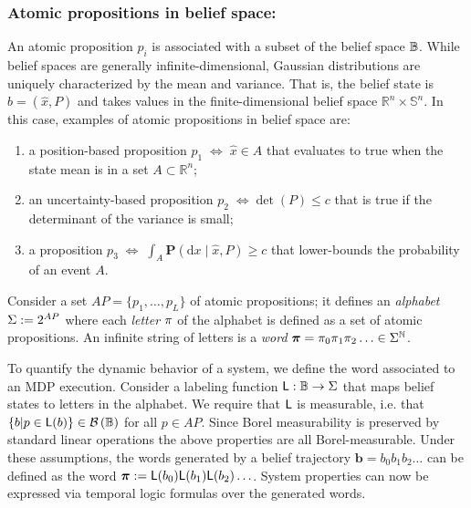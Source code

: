 \documentclass{ifacconf}
\begin{document}
\subsubsection{Atomic propositions in belief space:}

An atomic proposition $p_i$ is associated with a subset of the belief space $\mathbb{B}$. While belief spaces are generally infinite-dimensional, Gaussian distributions are uniquely characterized by the mean and variance. That is, the belief state is $b = (\hat x, P)$ and takes values in the finite-dimensional belief space $\mathbb{R}^n \times \mathbb{S}^n$. In this case, examples of atomic propositions in belief space are:
\begin{enumerate}
  \item a position-based proposition $p_1 \; \Leftrightarrow \; \hat x \in A$ that evaluates to true when the state mean is in a set $A \subset \mathbb{R}^n$;
  \item an uncertainty-based proposition $p_2 \; \Leftrightarrow \det(P) \leq c$ that is true if the determinant of the variance is small;
  \item a proposition $p_3 \; \Leftrightarrow \; \int_{A} \mathbf{P}( \mathrm{d} x \mid \hat x, P) \geq c$ that lower-bounds the probability of an event $A$.
\end{enumerate}

Consider a set $AP = \{ p_1, \ldots, p_L \}$ of atomic propositions; it defines an \emph{alphabet} $\Sigma := 2^{AP}$ where each \emph{letter} $\pi$ of the alphabet is defined as a set of atomic propositions. An infinite string of letters is a \emph{word} ${\boldsymbol{\pi}}=\pi_0\pi_1\pi_2\ldots\in\Sigma^{\mathbb{N}}$.

To quantify the dynamic behavior of a system, we define the word associated to an MDP execution. Consider a labeling function $\mathsf{L}:\mathbb{B}\rightarrow \Sigma$ that maps belief states to letters in the alphabet. We require that $\mathsf{L}$ is measurable, i.e. that $\{b| p \in \mathsf{L}(b) \}\in \mathcal{B}\left(\mathbb{B}\right)$ for all $p \in AP$. Since Borel measurability is preserved by standard linear operations \citep{azoff1974borel}%
 the above properties are all Borel-measurable. Under these assumptions, the words generated by a belief trajectory $\mathbf{b} = b_0 b_1 b_2 \ldots$ can be defined as the word ${\boldsymbol{\pi}}:=\mathsf{L}(b_0)\mathsf{L}(b_1) \mathsf{L}(b_2) \ldots$. System properties can now be expressed via temporal logic formulas over the generated words.
\end{document}
